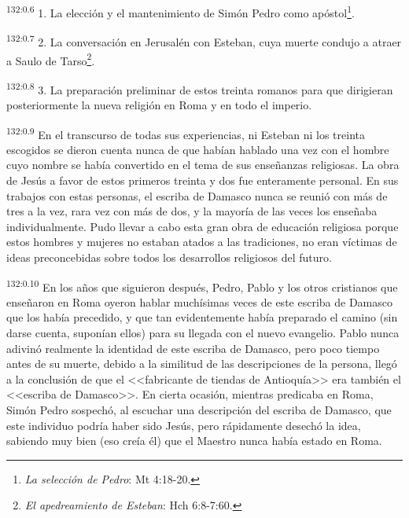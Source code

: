 \par 
\textsuperscript{132:0.6} 1. La elección y el mantenimiento de Simón Pedro como apóstol\footnote{\textit{La selección de Pedro}: Mt 4:18-20.}.

\par 
\textsuperscript{132:0.7} 2. La conversación en Jerusalén con Esteban, cuya muerte condujo a atraer a Saulo de Tarso\footnote{\textit{El apedreamiento de Esteban}: Hch 6:8-7:60.}.

\par 
\textsuperscript{132:0.8} 3. La preparación preliminar de estos treinta romanos para que dirigieran posteriormente la nueva religión en Roma y en todo el imperio.

\par 
\textsuperscript{132:0.9} En el transcurso de todas sus experiencias, ni Esteban ni los treinta escogidos se dieron cuenta nunca de que habían hablado una vez con el hombre cuyo nombre se había convertido en el tema de sus enseñanzas religiosas. La obra de Jesús a favor de estos primeros treinta y dos fue enteramente personal. En sus trabajos con estas personas, el escriba de Damasco nunca se reunió con más de tres a la vez, rara vez con más de dos, y la mayoría de las veces los enseñaba individualmente. Pudo llevar a cabo esta gran obra de educación religiosa porque estos hombres y mujeres no estaban atados a las tradiciones, no eran víctimas de ideas preconcebidas sobre todos los desarrollos religiosos del futuro.

\par 
\textsuperscript{132:0.10} En los años que siguieron después, Pedro, Pablo y los otros cristianos que enseñaron en Roma oyeron hablar muchísimas veces de este escriba de Damasco que los había precedido, y que tan evidentemente había preparado el camino (sin darse cuenta, suponían ellos) para su llegada con el nuevo evangelio. Pablo nunca adivinó realmente la identidad de este escriba de Damasco, pero poco tiempo antes de su muerte, debido a la similitud de las descripciones de la persona, llegó a la conclusión de que el <<fabricante de tiendas de Antioquía>> era también el <<escriba de Damasco>>. En cierta ocasión, mientras predicaba en Roma, Simón Pedro sospechó, al escuchar una descripción del escriba de Damasco, que este individuo podría haber sido Jesús, pero rápidamente desechó la idea, sabiendo muy bien (eso creía él) que el Maestro nunca había estado en Roma.

